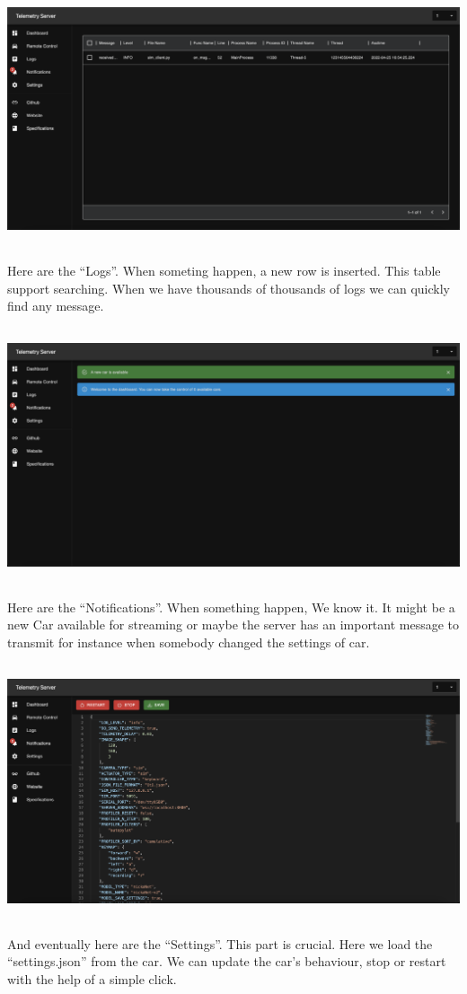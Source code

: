 \documentclass[12pt]{article}
\begin{document}
\centerline{\includegraphics[height=7.5cm]{../../docs/server-logs.png}}
Here are the “Logs”. When someting happen, a new row is inserted. This table support searching. When we have thousands of thousands of logs we can quickly find any message. \\


\centerline{\includegraphics[height=7.5cm]{../../docs/notifications.png}}
Here are the “Notifications”. When something happen, We know it. It might be a new Car available for streaming or maybe the server has an important message to transmit for instance when somebody changed the settings of car.

\centerline{\includegraphics[height=7.5cm]{../../docs/settings.png}}
And eventually here are the “Settings”. This part is crucial. Here we load the “settings.json” from the car. We can update the car’s behaviour, stop or restart with the help of a simple click.\\
\end{document}
